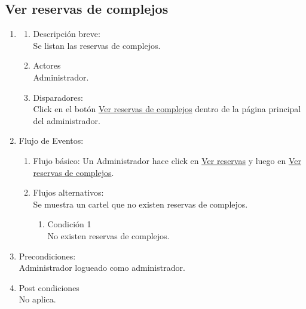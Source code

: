 \documentclass[a4paper,11pt]{article}
\begin{document}
\subsection{Ver reservas de complejos}
\begin{enumerate}

    \item
    \begin{enumerate}
    \item Descripción breve: \\
        Se listan las reservas de complejos.
    \item Actores \\
        Administrador.
    \item Disparadores: \\
        Click en el botón \underline{Ver reservas de complejos}
        dentro de la página principal del administrador.
    \end{enumerate}

    \item Flujo de Eventos:

    \begin{enumerate}

        \item Flujo básico:
            Un Administrador hace click en \underline{Ver reservas} y luego
            en \underline{Ver reservas de complejos}.
        \item Flujos alternativos:\\
            Se muestra un cartel que no existen reservas de complejos.
            \begin{enumerate}
                \item Condición 1 \\
                    No existen reservas de complejos.
            \end{enumerate}

    \end{enumerate}

    \item Precondiciones: \\
        Administrador logueado como administrador.

    \item Post condiciones \\
        No aplica.

\end{enumerate}
\end{document}
